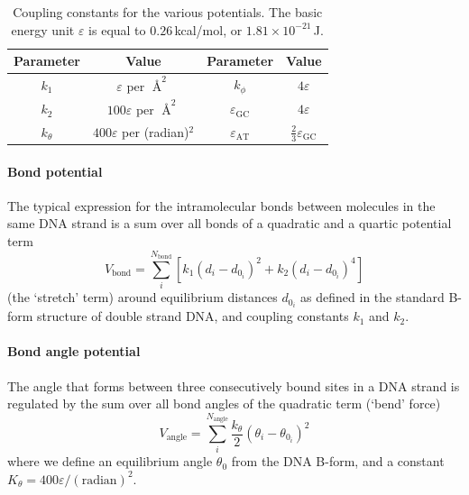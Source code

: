 \begin{table}[hbt]
\begin{center}
\label{couplingConstants}
\caption{Coupling constants for the various potentials. The basic energy unit $\varepsilon$ is equal to $0.26$\,kcal/mol, or $1.81 \times 10^{-21}$\,J.}

\begin{tabular}{cc||cc}
Parameter & Value & Parameter & Value\\\hline
$k_1$ & $\varepsilon$ per $\Angstrom^2$ &
	$k_\phi$ & $4\varepsilon$ \\
$k_2$ & $100\varepsilon$ per $\Angstrom^2$ &
	$\varepsilon_\text{GC}$ & $4\varepsilon$\\
$k_\theta$ & $400\varepsilon$ per (radian)$^2$ &
	$\varepsilon_\text{AT}$ & $\frac{2}{3} \varepsilon_\text{GC}$ \\
\end{tabular}
\end{center}
\end{table}

\paragraph{Bond potential} The typical expression for the intramolecular bonds between molecules in the same DNA strand is a sum over all bonds of a quadratic and a quartic potential term
\begin{equation}
V_{\text{bond}} = \sum_i^{N_{\text{bond}}} \left[ k_1 \left(d_i - d_{0_i}\right)^2 + k_2 \left(d_i - d_{0_i}\right)^4\right]
\end{equation}
(the `stretch' term) around equilibrium distances $d_{0_i}$ as defined in the standard B-form structure of double strand DNA, and coupling constants $k_1$ and $k_2$.

\paragraph{Bond angle potential} The angle that forms between three consecutively bound sites in a DNA strand is regulated by the sum over all bond angles of the quadratic term (`bend' force)
\begin{equation}
V_\text{angle} =  \sum_i^{N_\text{angle}} \frac{k_\theta}{2} \left( \theta_i - \theta_{0_i} \right)^2
\end{equation}
where we define an equilibrium angle $\theta_0$ from the DNA B-form, and a constant $K_\theta = 400\varepsilon / (\text{radian})^ 2$.

